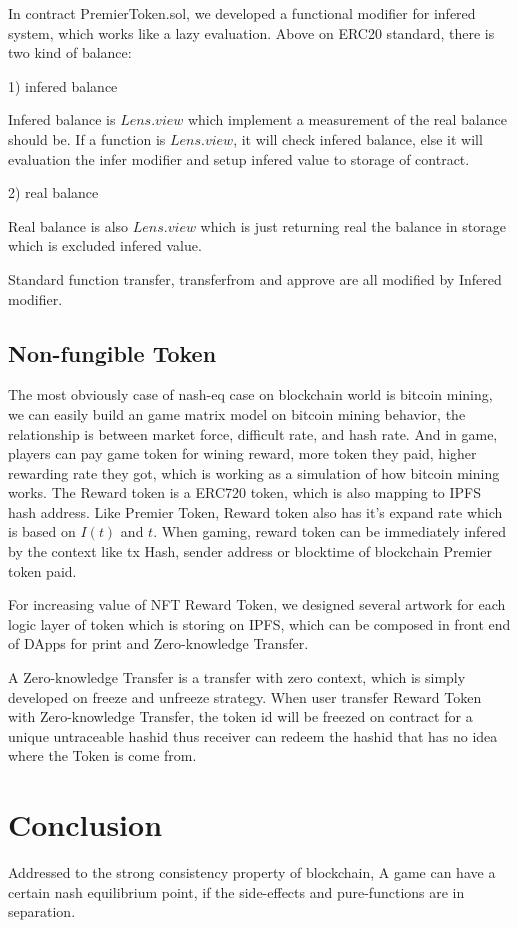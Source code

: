 \documentclass[twocolumn]{article}
\begin{document}
In contract PremierToken.sol, we developed a functional modifier for infered system, which works like a lazy evaluation. Above on ERC20 standard, there is two kind of balance:

1) infered balance

Infered balance is $Lens.view$ which implement a measurement of the real balance should be. If a function is $Lens.view$, it will check infered balance, else it will evaluation the infer modifier and setup infered value to storage of contract.

2) real balance

Real balance is also $Lens.view$ which is just returning real the balance in storage which is excluded infered value.

Standard function transfer, transferfrom and approve are all modified by Infered modifier.

\subsection {Non-fungible Token}

The most obviously case of nash-eq case on blockchain world is bitcoin mining\cite{bitcoin}, we can easily build an game matrix model on bitcoin mining behavior, the relationship is between market force, difficult rate, and hash rate. And in game, players can pay game token for wining reward, more token they paid, higher rewarding rate they got, which is working as a simulation of how bitcoin mining works. The Reward token is a ERC720 token, which is also mapping to IPFS hash address. Like Premier Token, Reward token also has it's expand rate which is based on $I(t)$ and $t$. When gaming, reward token can be immediately infered by the context like tx Hash, sender address or blocktime of blockchain Premier token paid.

For increasing value of NFT Reward Token, we designed several artwork for each logic layer of token which is storing on IPFS, which can be composed in front end of DApps for print and Zero-knowledge Transfer.

A Zero-knowledge Transfer is a transfer with zero context, which is simply developed on freeze and unfreeze strategy. When user transfer Reward Token with Zero-knowledge Transfer, the token id will be freezed on contract for a unique untraceable hashid thus receiver can redeem the hashid that has no idea where the Token is come from.


\section {Conclusion}

Addressed to the strong consistency property of blockchain, A game can have a certain nash equilibrium point, if the side-effects and pure-functions are in separation. 


\end{document}

